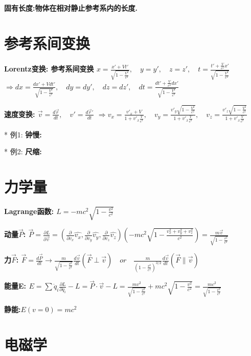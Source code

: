         \bf{固有长度}:物体在相对静止参考系内的长度.


    \section{参考系间变换}
        \bf{Lorentz变换}: 参考系间变换
            $ x = \frac{x' + V t'}{\sqrt{1 - \frac{V^2}{c^2}}},\quad y=y',\quad z=z', \quad t = \frac{t'+ \frac{V}{c^2}x'}{\sqrt{1 - \frac{V^2}{c^2}}}$
            $ \Rightarrow dx = \frac{dx' + V dt'}{\sqrt{1 - \frac{V^2}{c^2}}},\quad dy=dy',\quad dz=dz', \quad dt = \frac{dt'+ \frac{V}{c^2}dx'}{\sqrt{1 - \frac{V^2}{c^2}}}$
    
        \bf{速度变换}: $\vec v = \frac{d\vec r}{dt},\quad v' = \frac{d\vec r'}{dt}$
            $\Rightarrow v_x = \frac{v'_x + V}{1 + v'_x \frac{V}{c^2}}, \quad v_y = \frac{v'_y \sqrt{1 - \frac{V^2}{c^2}}}{1 + v'_x \frac{V}{c^2}},\quad v_z = \frac{v'_z \sqrt{1 - \frac{V^2}{c^2}}}{1 + v'_x \frac{V}{c^2}}$
            
        * 例1: \bf{钟慢}:
    
        * 例2: \bf{尺缩}:


    \section{力学量}
        \bf{Lagrange函数}:
            $L = -m c^2 \sqrt{1 - \frac{v^2}{c^2}}$
    
        \bf{动量$\vec P$}:
            $\vec P = \frac{\partial L}{\partial \vec v}= (\frac{\partial}{\partial v_x} \hat{v_x}, \frac{\partial}{\partial v_y} \hat{v_y}, \frac{\partial}{\partial v_z} \hat{v_z})(-m c^2 \sqrt{1 - \frac{v_x^2 + v_y^2 + v_z^2}{c^2}}) = \frac{m \vec v}{\sqrt{1 - \frac{v^2}{c^2}}}$
        
        \bf{力$\vec F$}:
            $\vec F = \frac{d\vec P}{dt} \to \frac{m}{\sqrt{1 - \frac{v^2}{c^2}}} \frac{d\vec v}{dt}(\vec F \perp \vec v) \quad or\quad  \frac{m}{(1 - \frac{v^2}{c^2})^{3/2}} \frac{d\vec v}{dt} (\vec F \parallel \vec v)$
    
        \bf{能量E}:
            $E = \sum \dot q_i \frac{\partial L}{\partial \dot q_i} - L = \vec P \cdot \vec v - L = \frac{m v^2}{\sqrt{1 - \frac{v^2}{c^2}}} + m c^2 \sqrt{1 - \frac{v^2}{c^2}} = \frac{mc^2}{\sqrt{1 - \frac{v^2}{c^2}}}$
    
        \bf{静能}:\quad $E(v=0) = m c^2$\\


\section{电磁学}
